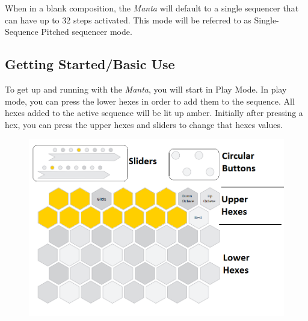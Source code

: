   When in a blank composition, the \emph{Manta} will default to a single sequencer
  that can have up to 32 steps activated. This mode will be referred to as
  Single-Sequence Pitched sequencer mode.

  \subsection{Getting Started/Basic Use}

  To get up and running with the \emph{Manta}, you will start in Play Mode. In play
  mode, you can press the lower hexes in order to add them to the sequence. All hexes
  added to the active sequence will be lit up amber.  Initially after pressing a hex,
  you can press the upper hexes and sliders to change that hexes
  values.

  \begin{figure}
    \includegraphics[width=\linewidth]{default.png}
  \end{figure}

